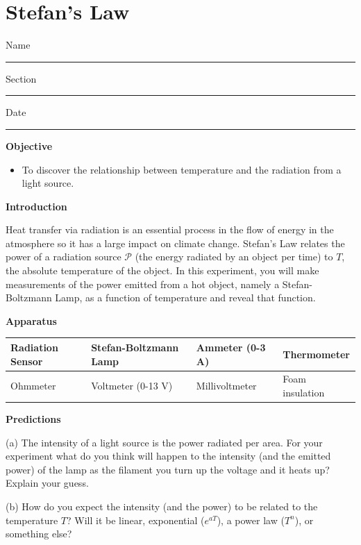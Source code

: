 \setcounter{figure}{0}
\setcounter{table}{0}

\section{Stefan's Law}

Name \rule{2.0in}{0.1pt}\hfill{}Section \rule{1.0in}{0.1pt}\hfill{}Date
\rule{1.0in}{0.1pt}

\textbf{Objective}

\begin{itemize}
\item To discover the relationship between temperature and the radiation from a light source.
\end{itemize}

\textbf{Introduction}

Heat transfer via radiation is an essential process in the flow of energy in the atmosphere
so it has a large impact on climate change.
Stefan's Law relates the power of a radiation source $\mathscr{P}$ 
(the energy radiated by an object per time) to $T$, the
absolute temperature of the object.
In this experiment, you will make  measurements of the power  emitted
from a hot object, namely a Stefan-Boltzmann Lamp, as a function of temperature
and reveal that function.

\textbf{Apparatus}

\begin{center}
\begin{tabular}{|l|l|l|l|} \hline
Radiation Sensor   & Stefan-Boltzmann Lamp & Ammeter (0-3 A) & Thermometer \\ \hline
Ohmmeter           & Voltmeter (0-13 V)    & Millivoltmeter  & Foam insulation   \\ \hline
\end{tabular}
\end{center}

\textbf{Predictions}

(a) The intensity of a light source is the power radiated per area. For your
experiment what do you think will happen to the intensity (and the emitted power)
of the lamp as the 
filament you turn up the voltage and it heats up? Explain your guess.
\vspace{1.5cm}

(b) How do you expect the intensity (and the power) to be related to the temperature $T$? 
Will it be linear, 
exponential ($e^{aT}$), a power law ($T^n$), or something else?
\vspace{1.5cm}


